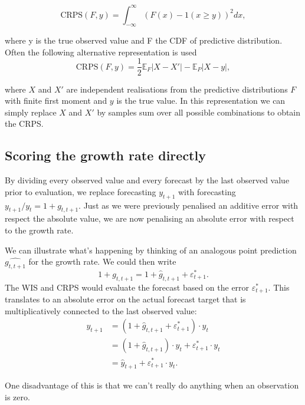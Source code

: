 \documentclass{article}
\begin{document}
\begin{equation}
    \text{CRPS}(F, y) = \int_{-\infty}^\infty \left( F(x) - 1(x \geq y) \right)^2 dx,
\end{equation}

where y is the true observed value and F the CDF of predictive distribution. Often the following alternative representation is used
\begin{equation}
    \text{CRPS}(F, y) = \frac{1}{2} \mathbb{E}_{F} |X - X'| - \mathbb{E}_P |X - y|,
\end{equation}
  
where $X$ and $X'$ are independent realisations from the predictive distributions $F$ with finite first moment and $y$ is the true value. In this representation we can simply replace $X$ and $X'$ by samples sum over all possible combinations to obtain the CRPS.  





\subsection{Scoring the growth rate directly}
By dividing every observed value and every forecast by the last observed value prior to evaluation, we replace forecasting $y_{t+1}$ with forecasting  $y_{t+1} / y_t = 1 + g_{t, t+1}$. Just as we were previously penalised an additive error with respect the absolute value, we are now penalising an absolute error with respect to the growth rate. 

We can illustrate what's happening by thinking of an analogous point prediction $\hat{g_{t, t+1}}$ for the growth rate. We could then write
\begin{equation}
    1 + g_{t, t+1} = 1 + \hat{g}_{t, t+1} + \varepsilon^*_{t+1}. 
\end{equation}
%
The WIS and CRPS would evaluate the forecast based on the error $\varepsilon^*_{t+1}$. This translates to an absolute error on the actual forecast target that is multiplicatively connected to the last observed value: 
\begin{align}
    y_{t+1} &= (1 + \hat{g}_{t, t+1} + \varepsilon^*_{t+1}) \cdot y_t \\
            &= (1 + \hat{g}_{t, t+1}) \cdot y_t + \varepsilon^*_{t+1} \cdot y_t \\
            &= \hat{y}_{t+1} + \varepsilon^*_{t+1} \cdot y_t.
\end{align}

One disadvantage of this is that we can't really do anything when an observation is zero. 
\end{document}
